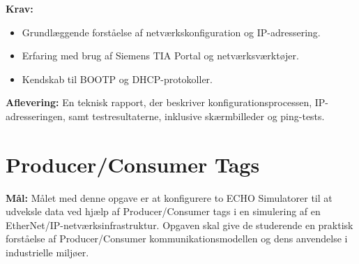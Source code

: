 \textbf{Krav:}
\begin{itemize}
	\item Grundlæggende forståelse af netværkskonfiguration og IP-adressering.
	\item Erfaring med brug af Siemens TIA Portal og netværksværktøjer.
	\item Kendskab til BOOTP og DHCP-protokoller.
\end{itemize}

\textbf{Aflevering:} En teknisk rapport, der beskriver konfigurationsprocessen, IP-adresseringen, samt testresultaterne, inklusive skærmbilleder og ping-tests.


\section{Producer/Consumer Tags}
\label{subsec:data_exchange_echo_simulators}

\textbf{Mål:} Målet med denne opgave er at konfigurere to ECHO Simulatorer til at udveksle data ved hjælp af Producer/Consumer tags i en simulering af en EtherNet/IP-netværksinfrastruktur. Opgaven skal give de studerende en praktisk forståelse af Producer/Consumer kommunikationsmodellen og dens anvendelse i industrielle miljøer.

